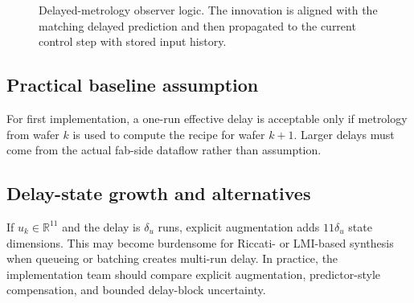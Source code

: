 \documentclass[11pt,a4paper]{article}
\newcommand{\R}{\mathbb{R}}
\begin{document}
\begin{figure}[h!]
\centering
{}
\caption{Delayed-metrology observer logic. The innovation is aligned with the matching delayed prediction and then propagated to the current control step with stored input history.}
\end{figure}

\subsection{Practical baseline assumption}
For first implementation, a one-run effective delay is acceptable only if metrology from wafer $k$ is used to compute the recipe for wafer $k+1$. Larger delays must come from the actual fab-side dataflow rather than assumption.

\subsection{Delay-state growth and alternatives}
If $u_k\in\R^{11}$ and the delay is $\delta_u$ runs, explicit augmentation adds $11\delta_u$ state dimensions. This may become burdensome for Riccati- or LMI-based synthesis when queueing or batching creates multi-run delay. In practice, the implementation team should compare explicit augmentation, predictor-style compensation, and bounded delay-block uncertainty.
\end{document}
